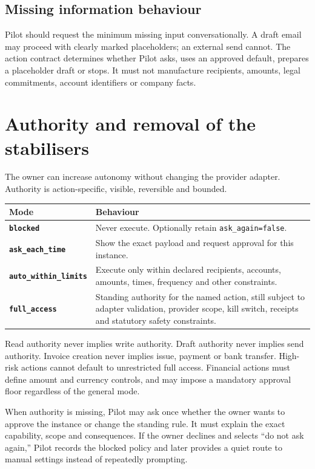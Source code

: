 \documentclass[11pt,a4paper]{article}
\newcommand{\code}[1]{\texttt{#1}}
\begin{document}
\subsection{Missing information behaviour}

Pilot should request the minimum missing input conversationally. A draft email
may proceed with clearly marked placeholders; an external send cannot. The
action contract determines whether Pilot asks, uses an approved default,
prepares a placeholder draft or stops. It must not manufacture recipients,
amounts, legal commitments, account identifiers or company facts.

\section{Authority and removal of the stabilisers}

The owner can increase autonomy without changing the provider adapter. Authority
is action-specific, visible, reversible and bounded.

\begin{longtable}{>{\bfseries}p{38mm}p{113mm}}
\toprule
Mode & Behaviour \\
\midrule
\code{blocked} & Never execute. Optionally retain \code{ask\_again=false}. \\
\code{ask\_each\_time} & Show the exact payload and request approval for this instance. \\
\code{auto\_within\_limits} & Execute only within declared recipients, accounts, amounts, times, frequency and other constraints. \\
\code{full\_access} & Standing authority for the named action, still subject to adapter validation, provider scope, kill switch, receipts and statutory safety constraints. \\
\bottomrule
\end{longtable}

Read authority never implies write authority. Draft authority never implies
send authority. Invoice creation never implies issue, payment or bank transfer.
High-risk actions cannot default to unrestricted full access. Financial actions
must define amount and currency controls, and may impose a mandatory approval
floor regardless of the general mode.

When authority is missing, Pilot may ask once whether the owner wants to approve
the instance or change the standing rule. It must explain the exact capability,
scope and consequences. If the owner declines and selects ``do not ask again,''
Pilot records the blocked policy and later provides a quiet route to manual
settings instead of repeatedly prompting.
\end{document}
